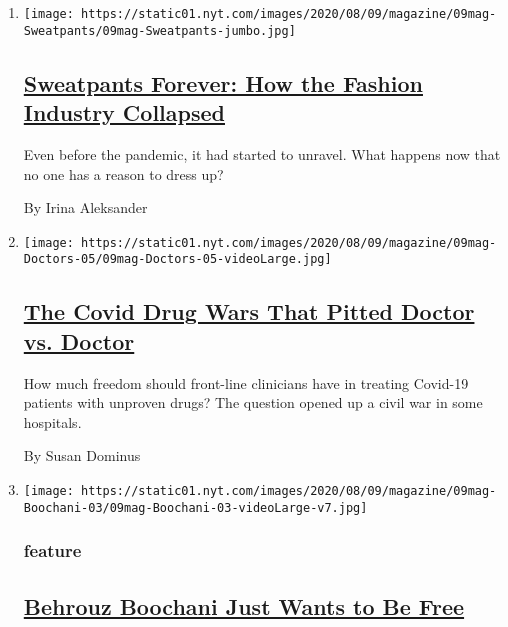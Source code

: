 \begin{enumerate}
\def\labelenumi{\arabic{enumi}.}
\item
  \texttt{[image: https://static01.nyt.com/images/2020/08/09/magazine/09mag-Sweatpants/09mag-Sweatpants-jumbo.jpg]}

  \hypertarget{sweatpants-forever-how-the-fashion-industry-collapsed}{%
  \subsection{\texorpdfstring{\href{/interactive/2020/08/06/magazine/fashion-sweatpants.html}{Sweatpants
  Forever: How the Fashion Industry
  Collapsed}}{Sweatpants Forever: How the Fashion Industry Collapsed}}\label{sweatpants-forever-how-the-fashion-industry-collapsed}}

  Even before the pandemic, it had started to unravel. What happens now
  that no one has a reason to dress up?

  By Irina Aleksander
\item
  \texttt{[image: https://static01.nyt.com/images/2020/08/09/magazine/09mag-Doctors-05/09mag-Doctors-05-videoLarge.jpg]}

  \hypertarget{the-covid-drug-wars-that-pitted-doctor-vs-doctor}{%
  \subsection{\texorpdfstring{\href{/2020/08/05/magazine/covid-drug-wars-doctors.html}{The
  Covid Drug Wars That Pitted Doctor vs.
  Doctor}}{The Covid Drug Wars That Pitted Doctor vs. Doctor}}\label{the-covid-drug-wars-that-pitted-doctor-vs-doctor}}

  How much freedom should front-line clinicians have in treating
  Covid-19 patients with unproven drugs? The question opened up a civil
  war in some hospitals.

  By Susan Dominus
\item
  \texttt{[image: https://static01.nyt.com/images/2020/08/09/magazine/09mag-Boochani-03/09mag-Boochani-03-videoLarge-v7.jpg]}

  \hypertarget{feature}{%
  \subsubsection{feature}\label{feature}}

  \hypertarget{behrouz-boochani-just-wants-to-be-free}{%
  \subsection{\texorpdfstring{\href{/2020/08/04/magazine/behrouz-boochani-australia.html}{Behrouz
  Boochani Just Wants to Be
  Free}}{Behrouz Boochani Just Wants to Be Free}}\label{behrouz-boochani-just-wants-to-be-free}}


\end{enumerate}
